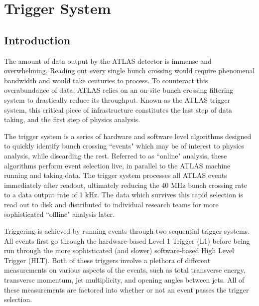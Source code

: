 \chapter{Trigger System} \label{chapter:trigger}

\section{Introduction}
    The amount of data output by the ATLAS detector is immense and overwhelming.
    Reading out every single bunch crossing would require phenomenal bandwidth and would take centuries to process.
    To counteract this overabundance of data, ATLAS relies on an on-site bunch crossing filtering system to drastically reduce its throughput.
    Known as the ATLAS trigger system, this critical piece of infrastructure constitutes the last step of data taking, and the first step of physics analysis.

    The trigger system is a series of hardware and software level algorithms designed to quickly identify bunch crossing ``events" which may be of interest to physics analysis, while discarding the rest.
    Referred to as ``online" analysis, these algorithms perform event selection live, in parallel to the ATLAS machine running and taking data.
    The trigger system processes all ATLAS events immediately after readout, ultimately reducing the 40 MHz bunch crossing rate to a data output rate of 1 kHz.
    The data which survives this rapid selection is read out to disk and distributed to individual research teams for more sophisticated ``offline" analysis later.
    
    Triggering is achieved by running events through two sequential trigger systems.
    All events first go through the hardware-based Level 1 Trigger (L1) before being run through the more sophisticated (and slower) software-based High Level Trigger (HLT).
    Both of these triggers involve a plethora of different measurements on various aspects of the events, such as total transverse energy, transverse momentum, jet multiplicity, and opening angles between jets.
    All of these measurements are factored into whether or not an event passes the trigger selection.

